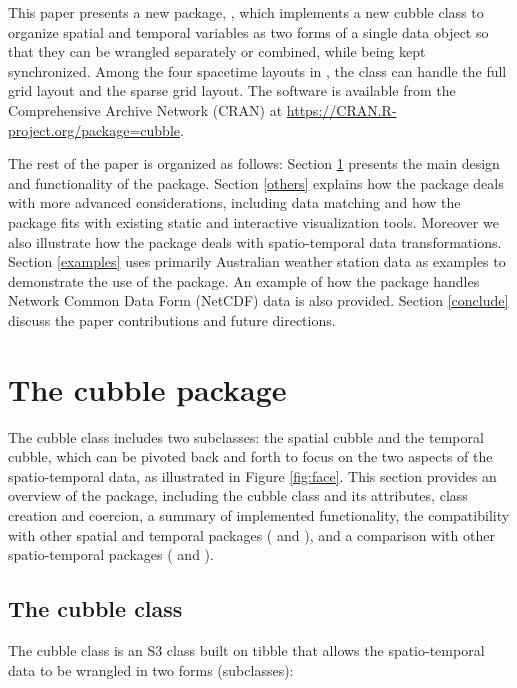 \documentclass[
  shortnames]{jss}
\begin{document}
This paper presents a new  package, , which implements a new cubble class to organize spatial and temporal variables as two forms of a single data object so that they can be wrangled separately or combined, while being kept synchronized. Among the four spacetime layouts in \citet{spacetime}, the  class can handle the full grid layout and the sparse grid layout. The software is available from the Comprehensive  Archive Network (CRAN) at \url{https://CRAN.R-project.org/package=cubble}.

The rest of the paper is organized as follows: Section \ref{cubble} presents the main design and functionality of the  package. Section \ref{others} explains how the  package deals with more advanced considerations, including data matching and how the package fits with existing static and interactive visualization tools. Moreover we also illustrate how the  package deals with spatio-temporal data transformations. Section \ref{examples} uses primarily Australian weather station data as examples to demonstrate the use of the package. An example of how the  package handles Network Common Data Form (NetCDF) data is also provided. Section \ref{conclude} discuss the paper contributions and future directions.

\hypertarget{cubble}{%
\section{The cubble package}\label{cubble}}

The cubble class includes two subclasses: the spatial cubble and the temporal cubble, which can be pivoted back and forth to focus on the two aspects of the spatio-temporal data, as illustrated in Figure \ref{fig:face}. This section provides an overview of the  package, including the cubble class and its attributes, class creation and coercion, a summary of implemented functionality, the compatibility with other spatial and temporal packages ( and ), and a comparison with other spatio-temporal packages ( and ).

\hypertarget{object}{%
\subsection{The cubble class}\label{object}}

The cubble class is an S3 class built on tibble that allows the spatio-temporal data to be wrangled in two forms (subclasses):
\end{document}
